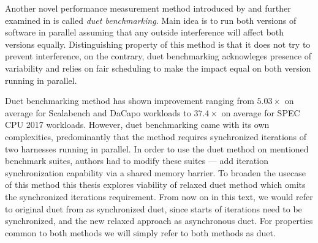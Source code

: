 Another novel performance measurement method introduced by \citet{bulej2019initial} and further examined in \citet{bulej2020duet} is called \emph{duet benchmarking}.
Main idea is to run both versions of software in parallel assuming that any outside interference will affect both versions equally.
Distinguishing property of this method is that it does not try to prevent interference, on the contrary, duet benchmarking acknowleges presence of variability and relies on fair scheduling to make the impact equal on both version running in parallel.

Duet benchmarking method has shown improvement ranging from $5.03 \times$ on average for Scalabench and DaCapo workloads to $37.4 \times$ on average for SPEC CPU 2017 workloads.
However, duet benchmarking came with its own complexities, predominantly that the method requires synchronized iterations of two harnesses running in parallel.
In order to use the duet method on mentioned benchmark suites, authors had to modify these suites --- add iteration synchronization capability via a shared memory barrier.
To broaden the usecase of this method this thesis explores viability of relaxed duet method which omits the synchronized iterations requirement.
From now on in this text, we would refer to original duet from \citet{bulej2020duet} as synchronized duet, since starts of iterations need to be synchronized, and the new relaxed approach as asynchronous duet.
For properties common to both methods we will simply refer to both methods as duet.
